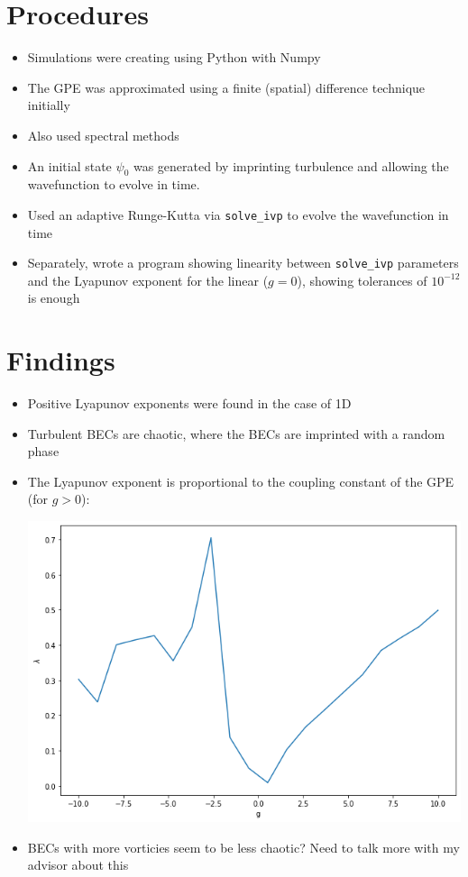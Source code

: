 \documentclass{homework}
\begin{document}
	\section{Procedures}
	\begin{itemize}
		\item Simulations were creating using Python with Numpy
		\item The GPE was approximated using a finite (spatial) difference technique initially
		\item Also used spectral methods
		\item An initial state $\psi_0$ was generated by imprinting turbulence and allowing the wavefunction to evolve in time. 
		\item Used an adaptive Runge-Kutta via \texttt{solve\_ivp} to evolve the wavefunction in time
		\item Separately, wrote a program showing linearity between \texttt{solve\_ivp} parameters and the Lyapunov exponent for the linear ($g=0$), showing tolerances of $10^{-12}$ is enough
	\end{itemize}
	
	\section{Findings}
	\begin{itemize}
		\item Positive Lyapunov exponents were found in the case of 1D
		\item Turbulent BECs are chaotic, where the BECs are imprinted with a random phase
		\item The Lyapunov exponent is proportional to the coupling constant of the GPE (for $g>0$):
		
		\begin{center}
			\includegraphics[width=0.7\linewidth]{g_vs_exp}
		\end{center}
		
		\item BECs with more vorticies seem to be less chaotic? Need to talk more with my advisor about this
	\end{itemize}
	
\end{document}
